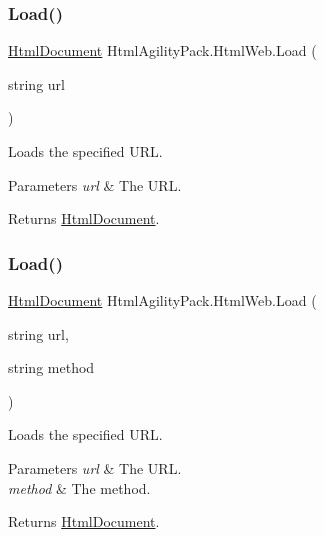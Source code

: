 \subsubsection{\texorpdfstring{Load()}{Load()}\hspace{0.1cm}{\footnotesize\ttfamily [1/4]}}
{\footnotesize\ttfamily \hyperlink{class_html_agility_pack_1_1_html_document}{Html\+Document} Html\+Agility\+Pack.\+Html\+Web.\+Load (\begin{DoxyParamCaption}\item[{string}]{url }\end{DoxyParamCaption})\hspace{0.3cm}{\ttfamily [inline]}}



Loads the specified U\+RL. 


\begin{DoxyParams}{Parameters}
{\em url} & The U\+RL.\\
\hline
\end{DoxyParams}
\begin{DoxyReturn}{Returns}
\hyperlink{class_html_agility_pack_1_1_html_document}{Html\+Document}.
\end{DoxyReturn}
\mbox{\label{class_html_agility_pack_1_1_html_web_a63115a52cc0785e2170f1ae1fca32105}} 
\subsubsection{\texorpdfstring{Load()}{Load()}\hspace{0.1cm}{\footnotesize\ttfamily [2/4]}}
{\footnotesize\ttfamily \hyperlink{class_html_agility_pack_1_1_html_document}{Html\+Document} Html\+Agility\+Pack.\+Html\+Web.\+Load (\begin{DoxyParamCaption}\item[{string}]{url,  }\item[{string}]{method }\end{DoxyParamCaption})\hspace{0.3cm}{\ttfamily [inline]}}



Loads the specified U\+RL. 


\begin{DoxyParams}{Parameters}
{\em url} & The U\+RL.\\
\hline
{\em method} & The method.\\
\hline
\end{DoxyParams}
\begin{DoxyReturn}{Returns}
\hyperlink{class_html_agility_pack_1_1_html_document}{Html\+Document}.
\end{DoxyReturn}

